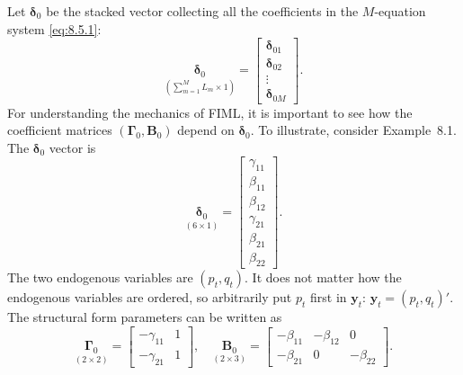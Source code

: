 Let $\boldsymbol{\delta}_0$ be the stacked vector collecting all the coefficients in the $M$-equation system
\eqref{eq:8.5.1}:
\begin{equation}
  \underset{(\sum_{m=1}^{M} L_m \times 1)}{\boldsymbol{\delta}_0}
  = \begin{bmatrix}
      \boldsymbol{\delta}_{01} \\ \boldsymbol{\delta}_{02} \\ \vdots \\ \boldsymbol{\delta}_{0M}
    \end{bmatrix}.
  \label{eq:8.5.12} \tag{8.5.12}
\end{equation}
For understanding the mechanics of FIML, it is important to see how the coefficient matrices $(\boldsymbol{\Gamma}_0, \mathbf{B}_0)$ depend on $\boldsymbol{\delta}_0$. To illustrate, consider Example~8.1.
The $\boldsymbol{\delta}_0$ vector is
\begin{equation}
  \underset{(6 \times 1)}{\boldsymbol{\delta}_0}
  = \begin{bmatrix}
      \gamma_{11} \\ \beta_{11} \\ \beta_{12} \\
      \gamma_{21} \\ \beta_{21} \\ \beta_{22}
    \end{bmatrix}.
  \label{eq:8.5.13} \tag{8.5.13}
\end{equation}
The two endogenous variables are $(p_t, q_t)$. It does not matter how the endogenous
variables are ordered, so arbitrarily put $p_t$ first in $\mathbf{y}_t$:
$\mathbf{y}_t = (p_t, q_t)'$. The structural
form parameters can be written as
\begin{equation}
  \underset{(2 \times 2)}{\boldsymbol{\Gamma}_0}
  = \begin{bmatrix} -\gamma_{11} & 1 \\ -\gamma_{21} & 1 \end{bmatrix}, \quad
  \underset{(2 \times 3)}{\mathbf{B}_0}
  = \begin{bmatrix}
      -\beta_{11} & -\beta_{12} & 0 \\
      -\beta_{21} & 0 & -\beta_{22}
    \end{bmatrix}.
  \label{eq:8.5.14} \tag{8.5.14}
\end{equation}

